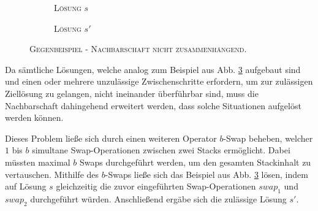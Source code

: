 \begin{figure}[H]
  \begin{subfigure}[b]{0.5\textwidth}
  \centering
    \caption{\textsc{Lösung $s$}}
    \label{fig:counter_a}
  \end{subfigure}
  \hfill
  \begin{subfigure}[b]{0.5\textwidth}
  \centering
    \caption{\textsc{Lösung $s'$}}
    \label{fig:counter_b}
  \end{subfigure}
  \caption{\textsc{Gegenbeispiel - Nachbarschaft nicht zusammenhängend.}}
  \label{fig:counter_example_stacks}
\end{figure}

Da sämtliche Lösungen, welche analog zum Beispiel aus Abb. \ref{fig:counter_example_stacks} aufgebaut sind und einen oder mehrere unzulässige Zwischenschritte erfordern, um zur zulässigen Ziellösung zu gelangen, nicht ineinander überführbar sind, muss die Nachbarschaft dahingehend erweitert werden, dass solche Situationen aufgelöst werden können.

Dieses Problem ließe sich durch einen weiteren Operator $b$-Swap beheben, welcher $1$ bis $b$ simultane Swap-Operationen
zwischen zwei Stacks ermöglicht. Dabei müssten maximal $b$ Swaps durchgeführt werden, um den gesamten Stackinhalt zu vertauschen.
Mithilfe des $b$-Swaps ließe sich das Beispiel aus Abb. \ref{fig:counter_example_stacks} lösen,
indem auf Lösung $s$ gleichzeitig die zuvor eingeführten Swap-Operationen $swap_1$ und $swap_2$ durchgeführt würden.
Anschließend ergäbe sich die zulässige Lösung $s'$.

